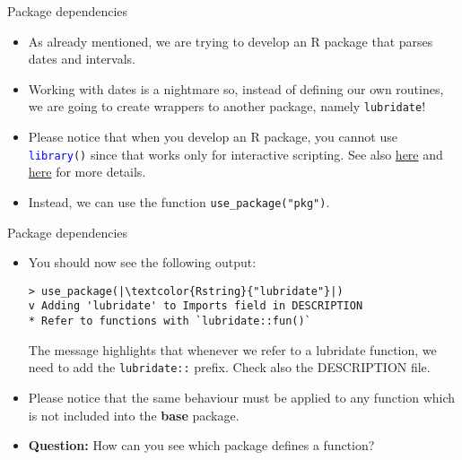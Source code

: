 \documentclass[
hyperref={bookmarks=false},
xcolor={dvipsnames,svgnames*,x11names*}, 
12pt
]{beamer}
\begin{document}
\begin{frame}[fragile]{Package dependencies}
\vspace{-0.5cm}
\begin{itemize}
\itemsep 2ex
\item As already mentioned, we are trying to develop an R package that parses dates and intervals. 
\item Working with dates is a nightmare so, instead of defining our own routines, we are going to create wrappers to another package, namely \texttt{lubridate}!
\item Please notice that when you develop an R package, you cannot use \texttt{\textcolor{blue}{library}()} since that works only for interactive scripting. See also \href{https://r-pkgs.org/dependencies-mindset-background.html}{here} and \href{https://r-pkgs.org/dependencies-in-practice.html}{here} for more details.  
\item Instead, we can use the function \texttt{use\_package(\textcolor{Rstring}{"pkg"})}. 
\end{itemize}
\end{frame}

\begin{frame}[fragile]{Package dependencies}
\vspace{-0.5cm}
\begin{itemize}
\itemsep 2ex
\item You should now see the following output: 
\begin{lstlisting}
> use_package(|\textcolor{Rstring}{"lubridate"}|)
v Adding 'lubridate' to Imports field in DESCRIPTION
* Refer to functions with `lubridate::fun()`
\end{lstlisting}
The message highlights that whenever we refer to a lubridate function, we need to add the \texttt{lubridate::} prefix. Check also the DESCRIPTION file. 
\item Please notice that the same behaviour must be applied to any function which is not included into the \textbf{base} package. 
\item \textbf{Question:} How can you see which package defines a function? 
\end{itemize}
\end{frame}
\end{document}
